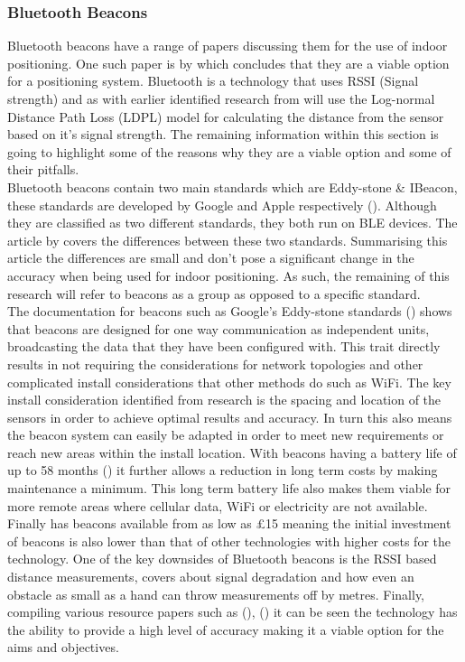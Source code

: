 \subsubsection{Bluetooth Beacons}
Bluetooth beacons have a range of papers discussing them for the use of indoor positioning. One such paper is by \cite{kingatua_2020_bluetooth} which concludes that they are a viable option for a positioning system. Bluetooth is a technology that uses RSSI (Signal strength) and as  with earlier identified research from \cite{kontakt_ibeacon} will use the Log-normal Distance Path Loss (LDPL) model for calculating the distance from the sensor based on it's signal strength. The remaining information within this section is going to highlight some of the reasons why they are a viable option and some of their pitfalls.\\ 

Bluetooth beacons contain two main standards which are Eddy-stone \& IBeacon, these standards are developed by Google and Apple respectively (\cite{kontakt_ibeacon}). Although they are classified as two different standards, they both run on BLE devices. The article by \cite{kontakt_ibeacon} covers the differences between these two standards. Summarising this article the differences are small and don't pose a significant change in the accuracy when being used for indoor positioning. As such, the remaining of this research will refer to beacons as a group as opposed to a specific standard.\\

The documentation for beacons such as Google's Eddy-stone standards (\cite{google_googleeddystone}) shows that beacons are designed for one way communication as independent units, broadcasting the data that they have been configured with. This trait directly results in not requiring the considerations for network topologies and other complicated install considerations that other methods do such as WiFi. The key install consideration identified from research is the spacing and location of the sensors in order to achieve optimal results and accuracy. In turn this also means the beacon system can easily be adapted in order to meet new requirements or reach new areas within the install location. With beacons having a battery life of up to 58 months (\cite{beaconzone_2016_google}) it further allows a reduction in long term costs by making maintenance a minimum. This long term battery life also makes them viable for more remote areas where cellular data, WiFi or electricity are not available. Finally \cite{beaconzone_2016_google} has beacons available from as low as £15 meaning the initial investment of beacons is also lower than that of other technologies with higher costs for the technology. One of the key downsides of Bluetooth beacons is the RSSI based distance measurements, \cite{comer_uwb_vs_ble} covers about signal degradation and how even an obstacle as small as a hand can throw measurements off by metres. Finally, compiling various resource papers such as (\cite{zhuang_2016_smartphonebased}), (\cite{kingatua_2020_bluetooth}) it can be seen the technology has the ability to provide a high level of accuracy making it a viable option for the aims and objectives.\\

